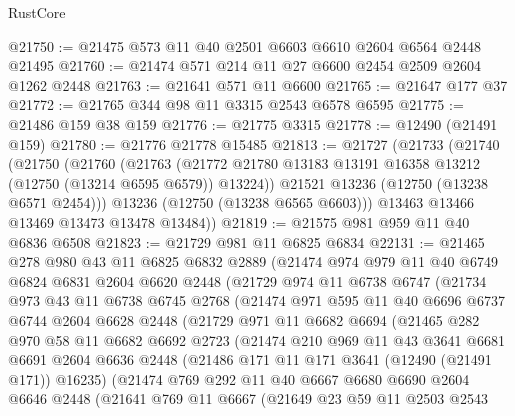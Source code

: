 \begin{lexlean}{RustCore}
\begin{coremodule}
@21750 := @21475 @573 @11 @40 @2501 @6603 @6610 @2604 @6564 @2448 @21495
@21760 := @21474 @571 @214 @11 @27 @6600 @2454 @2509 @2604 @1262 @2448
@21763 := @21641 @571 @11 @6600
@21765 := @21647 @177 @37
@21772 := @21765 @344 @98 @11 @3315 @2543 @6578 @6595
@21775 := @21486 @159 @38 @159
@21776 := @21775 @3315
@21778 := @12490 (@21491 @159)
@21780 := @21776 @21778 @15485
@21813 := @21727
    (@21733
      (@21740
        (@21750
          (@21760
            (@21763
              (@21772 @21780 @13183 @13191 @16358 @13212 (@12750 (@13214 @6595 @6579)) @13224))
            @21521
            @13236
            (@12750 (@13238 @6571 @2454)))
          @13236
          (@12750 (@13238 @6565 @6603)))
        @13463
        @13466
        @13469
        @13473
        @13478
        @13484))
@21819 := @21575 @981 @959 @11 @40 @6836 @6508
@21823 := @21729 @981 @11 @6825 @6834
@22131 := @21465
    @278
    @980
    @43
    @11
    @6825
    @6832
    @2889
    (@21474
      @974
      @979
      @11
      @40
      @6749
      @6824
      @6831
      @2604
      @6620
      @2448
      (@21729
        @974
        @11
        @6738
        @6747
        (@21734
          @973
          @43
          @11
          @6738
          @6745
          @2768
          (@21474
            @971
            @595
            @11
            @40
            @6696
            @6737
            @6744
            @2604
            @6628
            @2448
            (@21729
              @971
              @11
              @6682
              @6694
              (@21465
                @282
                @970
                @58
                @11
                @6682
                @6692
                @2723
                (@21474
                  @210
                  @969
                  @11
                  @43
                  @3641
                  @6681
                  @6691
                  @2604
                  @6636
                  @2448
                  (@21486 @171 @11 @171 @3641 (@12490 (@21491 @171)) @16235)
                  (@21474
                    @769
                    @292
                    @11
                    @40
                    @6667
                    @6680
                    @6690
                    @2604
                    @6646
                    @2448
                    (@21641
                      @769
                      @11
                      @6667
                      (@21649
                        @23
                        @59
                        @11
                        @2503
                        @2543

\end{coremodule}
\end{lexlean}
